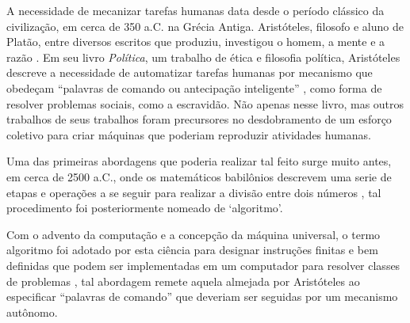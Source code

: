 \newcommand{\texCommand}[1]{\texttt{\textbackslash{#1}}}%

\newcommand{\exemplo}[1]{%
\vspace{\baselineskip}%
\noindent\fbox{\begin{minipage}{\textwidth}#1\end{minipage}}%
\\\vspace{\baselineskip}}%

\newcommand{\exemploVerbatim}[1]{%
\vspace{\baselineskip}%
\noindent\fbox{\begin{minipage}{\textwidth}%
#1\end{minipage}}%
\\\vspace{\baselineskip}}%

A necessidade de mecanizar tarefas humanas data desde o período clássico da
civilização, em cerca de 350 a.C. na Grécia Antiga. Aristóteles, filosofo e
aluno de Platão, entre diversos escritos que produziu, investigou o homem, a
mente e a razão \cite{russell2004history}. Em seu livro \textit{Política}, um
trabalho de ética e filosofia política, Aristóteles descreve a necessidade de
automatizar tarefas humanas por mecanismo que obedeçam ``palavras de comando ou
antecipação inteligente'' \cite{2013aristotle}, como forma de resolver
problemas sociais, como a escravidão. Não apenas nesse livro, mas outros
trabalhos de seus trabalhos foram precursores \cite{russell2016artificial} no
desdobramento de um esforço coletivo para criar máquinas que poderiam
reproduzir atividades humanas.

Uma das primeiras abordagens que poderia realizar tal feito surge muito antes,
em cerca de 2500 a.C., onde os matemáticos babilônios descrevem uma serie de
etapas e operações a se seguir para realizar a divisão entre dois números
\cite{chabert1999history}, tal procedimento foi posteriormente nomeado de
`algoritmo'.

Com o advento da computação e a concepção da máquina universal, o termo
algoritmo foi adotado por esta ciência para designar instruções finitas e bem
definidas que podem ser implementadas em um computador para resolver classes de
problemas \cite{britannica2006algorithm}, tal abordagem remete aquela almejada
por Aristóteles ao especificar ``palavras de comando'' que deveriam ser
seguidas por um mecanismo autônomo.

